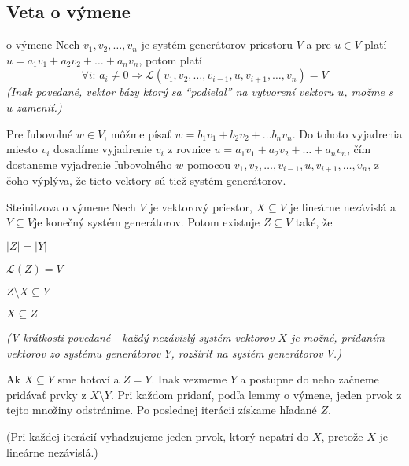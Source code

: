 \subsection{Veta o výmene}
\begin{lemmaN}{o výmene}
Nech $v_{1},v_{2}, \dots ,v_{n}$ je systém generátorov priestoru $V$ a pre $u \in V$ platí $u = a_{1}v_{1} + a_{2}v_{2} + \dots +a_{n}v_{n}$, potom platí 
$$\forall i: \, a_{i} \not= 0 \Rightarrow \mathcal{L}(v_{1},v_{2}, \dots, v_{i-1}, u, v_{i+1}, \dots, v_{n}) = V$$
\textit{(Inak povedané, vektor bázy ktorý sa ``podielal'' na vytvorení vektoru $u$, možme s $u$ zameniť.)}
\end{lemmaN}

\begin{dokaz}
Pre ľubovolné $w \in V$, môžme písať $w = b_{1}v_{1} + b_{2}v_{2} + \dots b_{n}v_{n}$.
Do tohoto vyjadrenia miesto $v_{i}$ dosadíme vyjadrenie $v_i$ z rovnice $u = a_{1}v_{1} + a_{2}v_{2} + \dots + a_{n}v_{n}$, čím dostaneme vyjadrenie ľubovolného $w$ pomocou $v_{1},v_{2}, \dots, v_{i-1}, u, v_{i+1}, \dots, v_{n}$, z čoho výplýva, že tieto vektory sú tiež systém generátorov.
\end{dokaz}

\pagebreak[3]
\begin{vetaSKN}{Steinitzova o výmene}
Nech $V$ je vektorový priestor, $X \subseteq V$ je lineárne nezávislá a $Y \subseteq V$je konečný systém generátorov. Potom existuje $Z \subseteq V$ také, že
\begin{pitemize}
	\item $|Z| = |Y|$
	\item $\mathcal{L}(Z) = V$
	\item $Z \setminus X \subseteq Y$
	\item $X \subseteq Z$
\end{pitemize}
\textit{(V krátkosti povedané - každý nezávislý systém vektorov $X$ je možné, pridaním vektorov zo systému generátorov $Y$, rozšíriť na systém generátorov $V$.)}
\end{vetaSKN}

\begin{dokaz}
Ak $X \subseteq Y$ sme hotoví a $Z=Y$.
Inak vezmeme $Y$ a postupne do neho začneme pridávať prvky z $X \setminus Y$.
Pri každom pridaní, podľa lemmy o výmene, jeden prvok z tejto množiny odstránime. Po poslednej iterácii získame hľadané $Z$.

(Pri každej iterácií vyhadzujeme jeden prvok, ktorý nepatrí do $X$, pretože $X$ je lineárne nezávislá.)
\end{dokaz}


